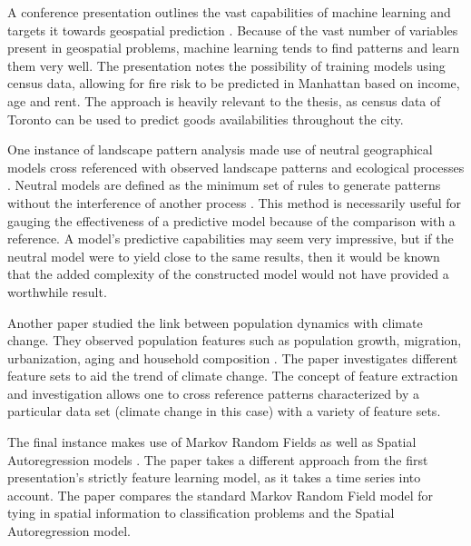 \documentclass[12pt]{article}
\begin{document}
   A conference presentation outlines the vast capabilities of machine learning and targets it towards geospatial prediction \cite{confpres}. Because of the vast number of variables present in geospatial problems, machine learning tends to find patterns and learn them very well. The presentation notes the possibility of training models using census data, allowing for fire risk to be predicted in Manhattan based on income, age and rent. The approach is heavily relevant to the thesis, as census data of Toronto can be used to predict goods availabilities throughout the city.

   One instance of landscape pattern analysis made use of neutral geographical models cross referenced with observed landscape patterns and ecological processes \cite{lpa}. Neutral models are defined as the minimum set of rules to generate patterns without the interference of another process \cite{neutralmodel}. This method is necessarily useful for gauging the effectiveness of a predictive model because of the comparison with a reference. A model's predictive capabilities may seem very impressive, but if the neutral model were to yield close to the same results, then it would be known that the added complexity of the constructed model would not have provided a worthwhile result. 

   Another paper studied the link between population dynamics with climate change. They observed population features such as population growth, migration, urbanization, aging and household composition \cite{popdyn}. The paper investigates different feature sets to aid the trend of climate change. The concept of feature extraction and investigation allows one to cross reference patterns characterized by a particular data set (climate change in this case) with a variety of feature sets. 

   The final instance makes use of Markov Random Fields as well as Spatial Autoregression models \cite{autoreg}. The paper takes a different approach from the first presentation's strictly feature learning model, as it takes a time series into account. The paper compares the standard Markov Random Field model for tying in spatial information to classification problems and the Spatial Autoregression model. 
\end{document}
